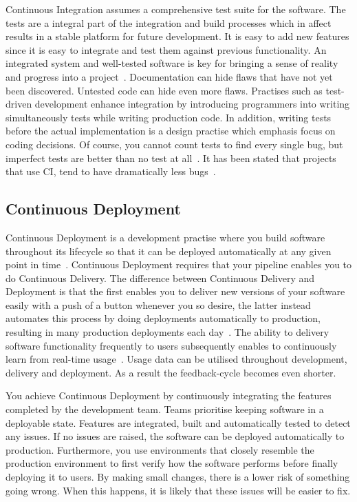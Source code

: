 \documentclass[english]{tktltiki2}
\begin{document}
Continuous Integration assumes a comprehensive test suite for the software. The tests are a integral part of the integration and build processes which in affect results in a stable platform for future development. It is easy to add new features since it is easy to integrate and test them against previous functionality. An integrated system and well-tested software is key for bringing a sense of reality and progress into a project~\cite{Fow05}. Documentation can hide flaws that have not yet been discovered. Untested code can hide even more flaws. Practises such as test-driven development enhance integration by introducing programmers into writing simultaneously tests while writing production code. In addition, writing tests before the actual implementation is a design practise which emphasis focus on coding decisions. Of course, you cannot count tests to find every single bug, but imperfect tests are better than no test at all~\cite{Fow06}. It has been stated that projects that use CI, tend to have dramatically less bugs~\cite{Fow06}.

\subsection{Continuous Deployment}

Continuous Deployment is a development practise where you build software throughout its lifecycle so that it can be deployed automatically at any given point in time~\cite{Fow13a}. Continuous Deployment requires that your pipeline enables you to do Continuous Delivery. The difference between Continuous Delivery and Deployment is that the first enables you to deliver new versions of your software easily with a push of a button whenever you so desire, the latter instead automates this process by doing deployments automatically to production, resulting in many production deployments each day~\cite{OR11, Sny13, Rub14}. The ability to delivery software functionality frequently to users subsequently enables to continuously learn from real-time usage~\cite{HAB12}. Usage data can be utilised throughout development, delivery and deployment. As a result the feedback-cycle becomes even shorter.

You achieve Continuous Deployment by continuously integrating the features completed by the development team. Teams prioritise keeping software in a deployable state. Features are integrated, built and automatically tested to detect any issues. If no issues are raised, the software can be deployed automatically to production. Furthermore, you use environments that closely resemble the production environment to first verify how the software performs before finally deploying it to users. By making small changes, there is a lower risk of something going wrong. When this happens, it is likely that these issues will be easier to fix.
\end{document}
